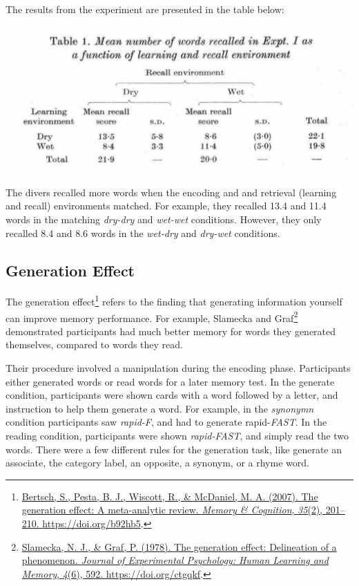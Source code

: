 \documentclass[
  oneside,
  12pt]{crumpbook}
\begin{document}
The results from the experiment are presented in the table below:

\begin{center}\includegraphics[width=1\linewidth]{imgs/Godden_Baddeley_data} \end{center}

The divers recalled more words when the encoding and and retrieval (learning and recall) environments matched. For example, they recalled 13.4 and 11.4 words in the matching \emph{dry-dry} and \emph{wet-wet} conditions. However, they only recalled 8.4 and 8.6 words in the \emph{wet-dry} and \emph{dry-wet} conditions.

\hypertarget{generation-effect}{%
\subsection{Generation Effect}\label{generation-effect}}

The generation effect\footnote{\protect\hyperlink{ref-bertschGenerationEffectMetaanalytic2007}{Bertsch, S., Pesta, B. J., Wiscott, R., \& McDaniel, M. A. (2007). The generation effect: {A} meta-analytic review. \emph{Memory \& Cognition}, \emph{35}(2), 201--210. \url{https://doi.org/b92hb5}}.} refers to the finding that generating information yourself can improve memory performance. For example, Slamecka and Graf\footnote{\protect\hyperlink{ref-slameckaGenerationEffectDelineation1978a}{Slamecka, N. J., \& Graf, P. (1978). The generation effect: {Delineation} of a phenomenon. \emph{Journal of Experimental Psychology: Human Learning and Memory}, \emph{4}(6), 592. \url{https://doi.org/ctgqkf}}.} demonstrated participants had much better memory for words they generated themselves, compared to words they read.

Their procedure involved a manipulation during the encoding phase. Participants either generated words or read words for a later memory test. In the generate condition, participants were shown cards with a word followed by a letter, and instruction to help them generate a word. For example, in the \emph{synonymn} condition participants saw \emph{rapid-F}, and had to generate rapid-\emph{FAST}. In the reading condition, participants were shown \emph{rapid-FAST}, and simply read the two words. There were a few different rules for the generation task, like generate an associate, the category label, an opposite, a synonym, or a rhyme word.
\end{document}
